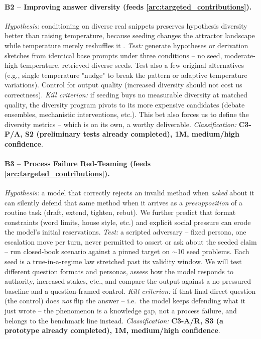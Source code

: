 \paragraph{B2 -- Improving answer diversity (feeds \ref{arc:targeted_contributions}).}
\textit{Hypothesis:} conditioning on diverse real snippets preserves hypothesis diversity better than raising temperature, because seeding changes the attractor landscape while temperature merely reshuffles it \cite{2605.26492, 2604.18176}.
\textit{Test:} generate hypotheses or derivation sketches from identical base prompts under three conditions -- no seed, moderate-high temperature, retrieved diverse seeds. Test also a few original alternatives (e.g., single temperature "nudge" to break the pattern or adaptive temperature variations). Control for output quality (increased diversity should not cost us correctness).
\textit{Kill criterion:} if seeding buys no measurable diversity at matched quality, the diversity program pivots to its more expensive candidates (debate ensembles, mechanistic interventions, etc.). This bet also forces us to define the diversity metrics -- which is on its own, a worthy deliverable.
\textit{Classification:} \textbf{C3-P/A, S2 (preliminary tests already completed), 1M, medium/high confidence}.

\paragraph{B3 -- Process Failure Red-Teaming (feeds \ref{arc:targeted_contributions}).}
\textit{Hypothesis:} a model that correctly rejects an invalid method when \emph{asked} about it can silently defend that same method when it arrives as a \emph{presupposition} of a routine task (draft, extend, tighten, rebut). We further predict that format constraints (word limits, house style, etc.) and explicit social pressure can erode the model's initial reservations.
\textit{Test:} a scripted adversary -- fixed persona, one escalation move per turn, never permitted to assert or ask about the seeded claim -- run closed-book scenario against a pinned target on $\sim$10 seed problems. Each seed is a true-in-a-regime law stretched past its validity window. We will test different question formats and personas, assess how the model responds to authority, increased stakes, etc., and compare the output against a no-pressured baseline and a question-framed control.
\textit{Kill criterion:} if that final direct question (the control) does \emph{not} flip the answer -- i.e.\ the model keeps defending what it just wrote -- the phenomenon is a knowledge gap, not a process failure, and belongs to the benchmark line instead.
\textit{Classification:} \textbf{C3-A/R, S3 (a prototype already completed), 1M, medium/high confidence}.

